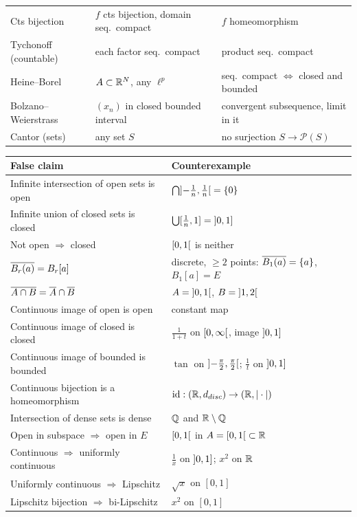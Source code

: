 \begin{center}
\begin{longtable}{@{}p{4.3cm}p{6.2cm}p{5.5cm}@{}}
Cts bijection & $f$ cts bijection, domain seq.\ compact & $f$ homeomorphism\\
Tychonoff (countable) & each factor seq.\ compact & product seq.\ compact\\
Heine--Borel & $A\subset\mathbb R^N$, any $\ell^p$ & seq.\ compact $\iff$ closed and bounded\\
Bolzano--Weierstrass & $(x_n)$ in closed bounded interval & convergent subsequence, limit in it\\
Cantor (sets) & any set $S$ & no surjection $S\to\mathcal P(S)$\\\bottomrule
\end{longtable}
\end{center}

\begin{center}
\renewcommand{\arraystretch}{1.25}
\begin{longtable}{@{}p{6.8cm}p{9.2cm}@{}}\toprule
False claim & Counterexample\\\midrule
Infinite intersection of open sets is open & $\bigcap\mathopen{]}-\frac1n,\frac1n\mathclose{[}=\{0\}$\\
Infinite union of closed sets is closed & $\bigcup[\frac1n,1]=\mathopen{]}0,1\mathclose{]}$\\
Not open $\Rightarrow$ closed & $\mathopen{[}0,1\mathclose{[}$ is neither\\
$\overline{B_r(a)}=B_r[a]$ & discrete, $\ge2$ points: $\overline{B_1(a)}=\{a\}$, $B_1[a]=E$\\
$\overline{A\cap B}=\overline{A}\cap\overline{B}$ & $A=\mathopen{]}0,1\mathclose{[}$, $B=\mathopen{]}1,2\mathclose{[}$\\
Continuous image of open is open & constant map\\
Continuous image of closed is closed & $\frac1{1+t}$ on $\mathopen{[}0,\infty\mathclose{[}$, image $\mathopen{]}0,1\mathclose{]}$\\
Continuous image of bounded is bounded & $\tan$ on $\mathopen{]}-\frac\pi2,\frac\pi2\mathclose{[}$; $\frac1t$ on $\mathopen{]}0,1\mathclose{]}$\\
Continuous bijection is a homeomorphism & $\operatorname{id}:(\mathbb R,d_{disc})\to(\mathbb R,|\cdot|)$\\
Intersection of dense sets is dense & $\mathbb Q$ and $\mathbb R\setminus\mathbb Q$\\
Open in subspace $\Rightarrow$ open in $E$ & $\mathopen{[}0,1\mathclose{[}$ in $A=\mathopen{[}0,1\mathclose{[}\subset\mathbb R$\\
Continuous $\Rightarrow$ uniformly continuous & $\frac1x$ on $\mathopen{]}0,1\mathclose{]}$; $x^2$ on $\mathbb R$\\
Uniformly continuous $\Rightarrow$ Lipschitz & $\sqrt x$ on $[0,1]$\\
Lipschitz bijection $\Rightarrow$ bi-Lipschitz & $x^2$ on $[0,1]$\\

\end{longtable}
\end{center}
